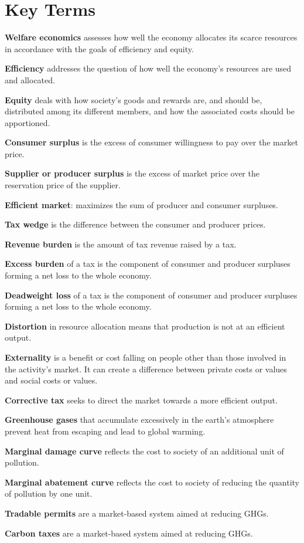 \newpage
	\section*{Key Terms}
\begin{keyterms}
\textbf{Welfare economics} assesses how well the economy allocates its scarce resources in accordance with the goals of efficiency and equity.

\textbf{Efficiency} addresses the question of how well the economy's resources are used and allocated.

\textbf{Equity} deals with how society's goods and rewards are, and should be, distributed among its different members, and how the associated costs should be apportioned.

\textbf{Consumer surplus} is the excess of consumer willingness to pay over the market price.

\textbf{Supplier or producer surplus} is the excess of market price over the reservation price of the supplier.

\textbf{Efficient market}: maximizes the sum of producer and consumer surpluses.

\textbf{Tax wedge} is the difference between the consumer and producer prices.

\textbf{Revenue burden} is the amount of tax revenue raised by a tax.

\textbf{Excess burden} of a tax is the component of consumer and producer surpluses forming a net loss to the whole economy.

\textbf{Deadweight loss} of a tax is the component of consumer and producer surpluses forming a net loss to the whole economy.

\textbf{Distortion} in resource allocation means that production is not at an efficient output.

\textbf{Externality} is a benefit or cost falling on people other than those involved in the activity's market. It can create a difference between private costs or values and social costs or values.

\textbf{Corrective tax} seeks to direct the market towards a more efficient output.

\textbf{Greenhouse gases} that accumulate excessively in the earth's atmosphere prevent heat from escaping and lead to global warming.

\textbf{Marginal damage curve} reflects the cost to society of an additional unit of pollution.

\textbf{Marginal abatement curve} reflects the cost to society of reducing the quantity of pollution by one unit.

\textbf{Tradable permits} are a market-based system aimed at reducing GHGs.

\textbf{Carbon taxes} are a market-based system aimed at reducing GHGs.
\end{keyterms}